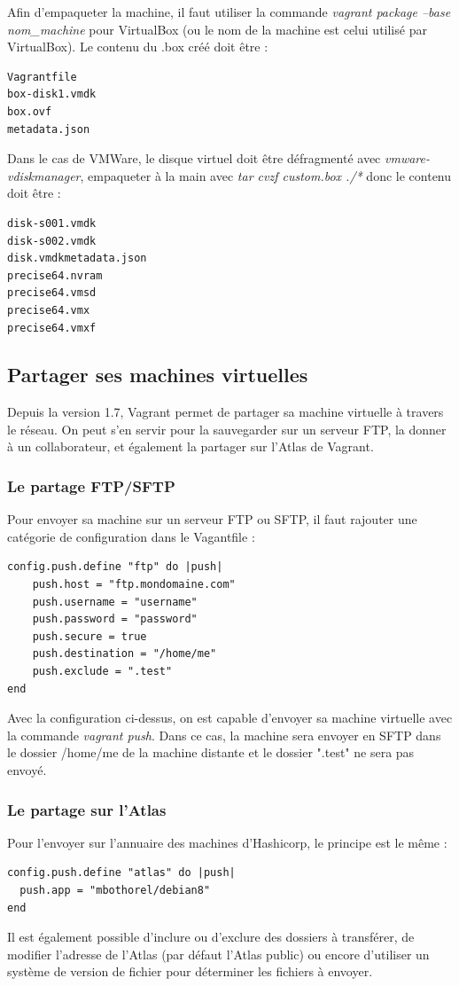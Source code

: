 \documentclass[12pt,a4paper]{article}
\begin{document}
Afin d'empaqueter la machine, il faut utiliser la commande \textit{vagrant package --base nom\_machine} pour VirtualBox (ou le nom de la machine est celui utilisé par VirtualBox). Le contenu du .box créé doit être :
\begin{lstlisting}
Vagrantfile
box-disk1.vmdk
box.ovf
metadata.json
\end{lstlisting}

Dans le cas de VMWare, le disque virtuel doit être défragmenté avec \textit{vmware-vdiskmanager}, empaqueter à la main avec \textit{tar cvzf custom.box ./*} donc le contenu doit être :
\begin{lstlisting}
disk-s001.vmdk
disk-s002.vmdk
disk.vmdkmetadata.json
precise64.nvram
precise64.vmsd
precise64.vmx
precise64.vmxf
\end{lstlisting}

\subsection{Partager ses machines virtuelles}
Depuis la version 1.7, Vagrant permet de partager sa machine virtuelle à travers le réseau. On peut s'en servir pour la sauvegarder sur un serveur FTP, la donner à un collaborateur, et également la partager sur l'Atlas de Vagrant.

\subsubsection{Le partage FTP/SFTP}
Pour envoyer sa machine sur un serveur FTP ou SFTP, il faut rajouter une catégorie de configuration dans le Vagantfile :
\begin{lstlisting}
config.push.define "ftp" do |push|
	push.host = "ftp.mondomaine.com"
	push.username = "username"
	push.password = "password"
	push.secure = true
	push.destination = "/home/me"
	push.exclude = ".test"
end
\end{lstlisting}
Avec la configuration ci-dessus, on est capable d'envoyer sa machine virtuelle avec la commande \textit{vagrant push}. Dans ce cas, la machine sera envoyer en SFTP dans le dossier /home/me de la machine distante et le dossier ".test" ne sera pas envoyé.

\subsubsection{Le partage sur l'Atlas}
Pour l'envoyer sur l'annuaire des machines d'Hashicorp, le principe est le même :
\begin{lstlisting}
config.push.define "atlas" do |push|
  push.app = "mbothorel/debian8"
end
\end{lstlisting}
Il est également possible d'inclure ou d'exclure des dossiers à transférer, de modifier l'adresse de l'Atlas (par défaut l'Atlas public) ou encore d'utiliser un système de version de fichier pour déterminer les fichiers à envoyer.
\end{document}
